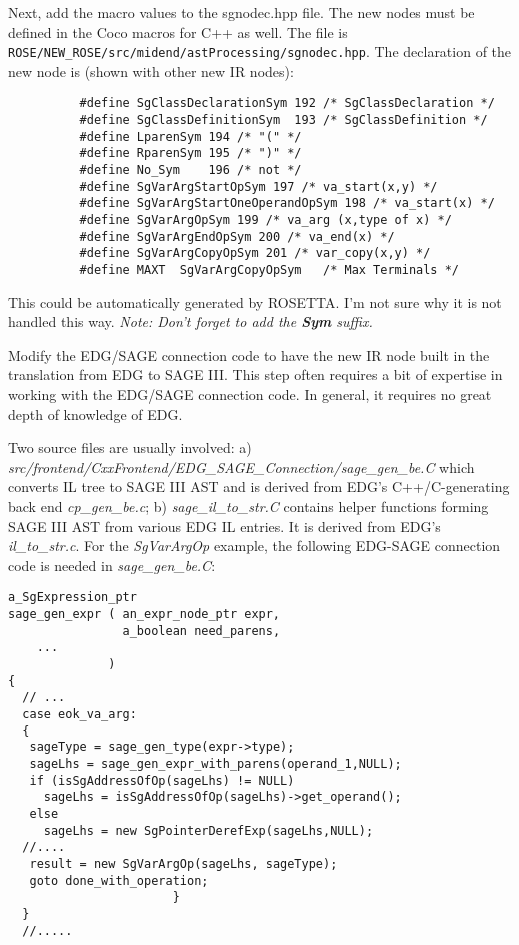 \begin{enumerate}
{     \item Next, add the macro values to the sgnodec.hpp file.
           The new nodes must be defined in the Coco macros for C++ as well.
           The file is {\tt ROSE/NEW\_ROSE/src/midend/astProcessing/sgnodec.hpp}.
           The declaration of the new node is (shown with other new IR nodes):
{\indent
{\mySmallFontSize
\begin{verbatim}
          #define SgClassDeclarationSym	192	/* SgClassDeclaration */
          #define SgClassDefinitionSym	193	/* SgClassDefinition */
          #define LparenSym	194	/* "(" */
          #define RparenSym	195	/* ")" */
          #define No_Sym	196	/* not */
          #define SgVarArgStartOpSym 197 /* va_start(x,y) */
          #define SgVarArgStartOneOperandOpSym 198 /* va_start(x) */
          #define SgVarArgOpSym 199 /* va_arg (x,type of x) */
          #define SgVarArgEndOpSym 200 /* va_end(x) */
          #define SgVarArgCopyOpSym 201 /* var_copy(x,y) */
          #define MAXT	SgVarArgCopyOpSym	/* Max Terminals */
\end{verbatim} 
}}
          This could be automatically generated by ROSETTA. I'm not sure why it is
          not handled this way. {\em Note: Don't forget to add the {\bf Sym} suffix.}
} %

     \item Modify the EDG/SAGE connection code to have the new IR node built in the
           translation from EDG to SAGE III.  This step often requires a bit of expertise
           in working with the EDG/SAGE connection code. In general, it requires no great
           depth of knowledge of EDG.


           Two source files are usually involved: a)
           \textit{src/frontend/CxxFrontend/EDG\_SAGE\_Connection/sage\_gen\_be.C}
           which converts IL tree to SAGE III AST and is derived from EDG's 
           C++/C-generating back end \textit{cp\_gen\_be.c}; b)
           \textit{sage\_il\_to\_str.C} contains helper functions forming SAGE
           III AST from various EDG IL entries. It is derived from EDG's
           \textit{il\_to\_str.c}.  For the {\em SgVarArgOp} example, the
           following EDG-SAGE connection code is needed in
           \textit{sage\_gen\_be.C}:
{\indent
{\mySmallFontSize
\begin{verbatim}
a_SgExpression_ptr
sage_gen_expr ( an_expr_node_ptr expr, 
                a_boolean need_parens, 
    ...
              )
{
  // ...
  case eok_va_arg:
  {
   sageType = sage_gen_type(expr->type);
   sageLhs = sage_gen_expr_with_parens(operand_1,NULL);
   if (isSgAddressOfOp(sageLhs) != NULL)
     sageLhs = isSgAddressOfOp(sageLhs)->get_operand();
   else
     sageLhs = new SgPointerDerefExp(sageLhs,NULL);
  //....
   result = new SgVarArgOp(sageLhs, sageType);
   goto done_with_operation;
                       }
  }
  //.....


\end{verbatim}}}
\end{enumerate}
